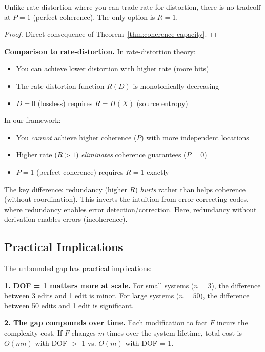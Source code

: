 \begin{corollary}[No Tradeoff at $P = 1$]\label{cor:no-tradeoff}
Unlike rate-distortion where you can trade rate for distortion, there is no tradeoff at $P = 1$ (perfect coherence). The only option is $R = 1$.
\end{corollary}

\begin{proof}
Direct consequence of Theorem~\ref{thm:coherence-capacity}.
\end{proof}

\textbf{Comparison to rate-distortion.} In rate-distortion theory:
\begin{itemize}
\tightlist
\item You can achieve lower distortion with higher rate (more bits)
\item The rate-distortion function $R(D)$ is monotonically decreasing
\item $D = 0$ (lossless) requires $R = H(X)$ (source entropy)
\end{itemize}

In our framework:
\begin{itemize}
\tightlist
\item You \emph{cannot} achieve higher coherence ($P$) with more independent locations
\item Higher rate ($R > 1$) \emph{eliminates} coherence guarantees ($P = 0$)
\item $P = 1$ (perfect coherence) requires $R = 1$ exactly
\end{itemize}

The key difference: redundancy (higher $R$) \emph{hurts} rather than helps coherence (without coordination). This inverts the intuition from error-correcting codes, where redundancy enables error detection/correction. Here, redundancy without derivation enables errors (incoherence).

\subsection{Practical Implications}\label{sec:practical-implications}

The unbounded gap has practical implications:

\textbf{1. DOF = 1 matters more at scale.} For small systems ($n = 3$), the difference between 3 edits and 1 edit is minor. For large systems ($n = 50$), the difference between 50 edits and 1 edit is significant.

\textbf{2. The gap compounds over time.} Each modification to fact $F$ incurs the complexity cost. If $F$ changes $m$ times over the system lifetime, total cost is $O(mn)$ with DOF $>$ 1 vs. $O(m)$ with DOF = 1.


